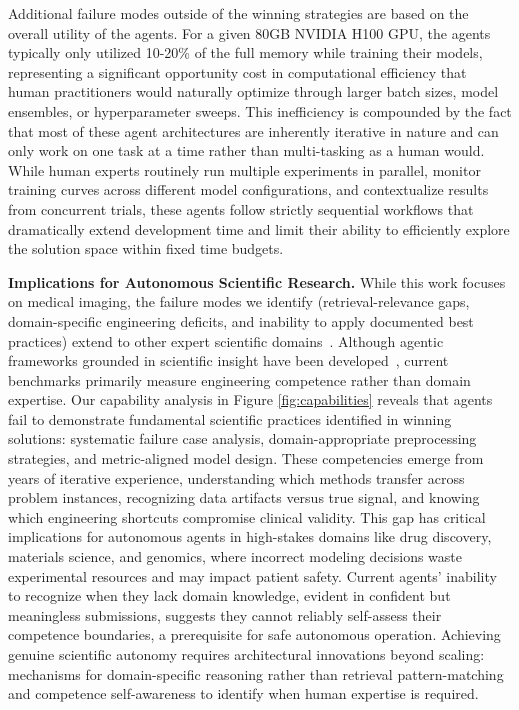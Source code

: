 \documentclass{midl} %
\begin{document}
Additional failure modes outside of the winning strategies are based on the overall utility of the agents. For a given 80GB NVIDIA H100 GPU, the agents typically only utilized 10-20\% of the full memory while training their models, representing a significant opportunity cost in computational efficiency that human practitioners would naturally optimize through larger batch sizes, model ensembles, or hyperparameter sweeps. This inefficiency is compounded by the fact that most of these agent architectures are inherently iterative in nature and can only work on one task at a time rather than multi-tasking as a human would. While human experts routinely run multiple experiments in parallel, monitor training curves across different model configurations, and contextualize results from concurrent trials, these agents follow strictly sequential workflows that dramatically extend development time and limit their ability to efficiently explore the solution space within fixed time budgets.

\vspace{3pt} \noindent \textbf{Implications for Autonomous Scientific Research.}
While this work focuses on medical imaging, the failure modes we identify (retrieval-relevance gaps, domain-specific engineering deficits, and inability to apply documented best practices) extend to other expert scientific domains~\cite{schmidgall2024agentclinic, xie2024travelplanner, mitchener2025bixbench}. Although agentic frameworks grounded in scientific insight have been developed~\cite{ding2025scitoolagent, jansen2024discoveryworld}, current benchmarks primarily measure engineering competence rather than domain expertise. Our capability analysis in Figure \ref{fig:capabilities} reveals that agents fail to demonstrate fundamental scientific practices identified in winning solutions: systematic failure case analysis, domain-appropriate preprocessing strategies, and metric-aligned model design. These competencies emerge from years of iterative experience, understanding which methods transfer across problem instances, recognizing data artifacts versus true signal, and knowing which engineering shortcuts compromise clinical validity. This gap has critical implications for autonomous agents in high-stakes domains like drug discovery, materials science, and genomics, where incorrect modeling decisions waste experimental resources and may impact patient safety. Current agents' inability to recognize when they lack domain knowledge, evident in confident but meaningless submissions, suggests they cannot reliably self-assess their competence boundaries, a prerequisite for safe autonomous operation. Achieving genuine scientific autonomy requires architectural innovations beyond scaling: mechanisms for domain-specific reasoning rather than retrieval pattern-matching and competence self-awareness to identify when human expertise is required.
\end{document}

